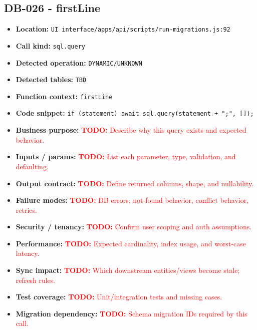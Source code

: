 \documentclass[11pt]{article}
\newcommand{\todoitem}[1]{\textcolor{red}{\textbf{TODO:} #1}}
\begin{document}
\subsection{DB-026 - firstLine}
\begin{itemize}[leftmargin=1.5em]
\item \textbf{Location:} \texttt{UI interface/apps/api/scripts/run-migrations.js:92}
\item \textbf{Call kind:} \texttt{sql.query}
\item \textbf{Detected operation:} \texttt{DYNAMIC/UNKNOWN}
\item \textbf{Detected tables:} \texttt{TBD}
\item \textbf{Function context:} \texttt{firstLine}
\item \textbf{Code snippet:} \texttt{if (statement) await sql.query(statement + ";", []);}
\item \textbf{Business purpose:} \todoitem{Describe why this query exists and expected behavior.}
\item \textbf{Inputs / params:} \todoitem{List each parameter, type, validation, and defaulting.}
\item \textbf{Output contract:} \todoitem{Define returned columns, shape, and nullability.}
\item \textbf{Failure modes:} \todoitem{DB errors, not-found behavior, conflict behavior, retries.}
\item \textbf{Security / tenancy:} \todoitem{Confirm user scoping and auth assumptions.}
\item \textbf{Performance:} \todoitem{Expected cardinality, index usage, and worst-case latency.}
\item \textbf{Sync impact:} \todoitem{Which downstream entities/views become stale; refresh rules.}
\item \textbf{Test coverage:} \todoitem{Unit/integration tests and missing cases.}
\item \textbf{Migration dependency:} \todoitem{Schema migration IDs required by this call.}
\end{itemize}
\end{document}
